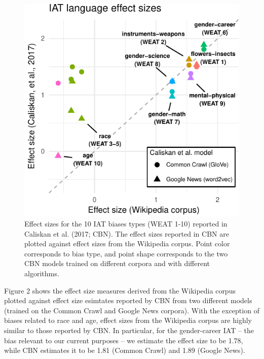 \documentclass[10pt, letterpaper]{article}
\newenvironment{CodeChunk}{}{}
\begin{document}
\begin{CodeChunk}
\begin{figure}[t]

{\centering \includegraphics{figs/WEAT_plot-1} 

}

\caption[Effect sizes for the 10 IAT biases types (WEAT 1-10) reported in Caliskan et al]{Effect sizes for the 10 IAT biases types (WEAT 1-10) reported in Caliskan et al. (2017; CBN). The effect sizes reported in CBN are plotted against  effect sizes from the Wikipedia corpus.  Point color corresponds to  bias type, and point shape corresponds to the two CBN models trained on different corpora and with different algorithms.}\label{fig:WEAT_plot}
\end{figure}
\end{CodeChunk}

Figure 2 shows the effect size measures derived from the Wikipedia
corpus plotted against effect size esimtates reported by CBN from two
different models (trained on the Common Crawl and Google News corpora).
With the exception of biases related to race and age, effect sizes from
the Wikipedia corpus are highly similar to those reported by CBN. In
particular, for the gender-career IAT -- the bias relevant to our
current purposes -- we estimate the effect size to be 1.78, while CBN
estimates it to be 1.81 (Common Crawl) and 1.89 (Google News).
\end{document}

